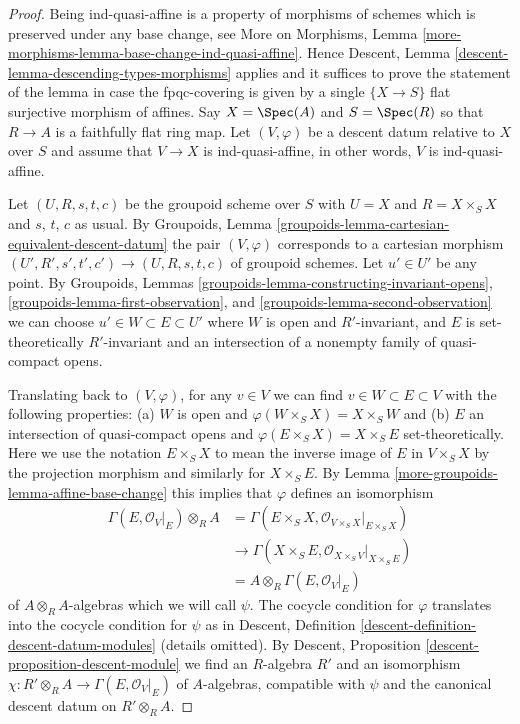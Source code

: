 \begin{proof}
Being ind-quasi-affine is a property of morphisms of schemes
which is preserved under any base change, see
More on Morphisms, Lemma
\ref{more-morphisms-lemma-base-change-ind-quasi-affine}.
Hence Descent, Lemma \ref{descent-lemma-descending-types-morphisms} applies
and it suffices to prove the statement of the lemma
in case the fpqc-covering is given by a single
$\{X \to S\}$ flat surjective morphism of affines.
Say $X = \Spec(A)$ and $S = \Spec(R)$ so
that $R \to A$ is a faithfully flat ring map.
Let $(V, \varphi)$ be a descent datum relative to $X$ over $S$
and assume that $V \to X$ is ind-quasi-affine, in other words,
$V$ is ind-quasi-affine.

\medskip\noindent
Let $(U, R, s, t, c)$ be the groupoid scheme over $S$ with
$U = X$ and $R = X \times_S X$ and $s$, $t$, $c$ as usual.
By Groupoids, Lemma \ref{groupoids-lemma-cartesian-equivalent-descent-datum}
the pair $(V, \varphi)$ corresponds to a cartesian morphism
$(U', R', s', t', c') \to (U, R, s, t, c)$ of groupoid schemes.
Let $u' \in U'$ be any point. By
Groupoids, Lemmas \ref{groupoids-lemma-constructing-invariant-opens},
\ref{groupoids-lemma-first-observation}, and
\ref{groupoids-lemma-second-observation}
we can choose $u' \in W \subset E \subset U'$
where $W$ is open and $R'$-invariant, and
$E$ is set-theoretically $R'$-invariant and
an intersection of a nonempty family of quasi-compact opens.

\medskip\noindent
Translating back to $(V, \varphi)$, for any $v \in V$ we can find
$v \in W \subset E \subset V$ with the following properties:
(a) $W$ is open and $\varphi(W \times_S X) = X \times_S W$ and
(b) $E$ an intersection of quasi-compact opens and
$\varphi(E \times_S X) = X \times_S E$ set-theoretically.
Here we use the notation $E \times_S X$ to mean the
inverse image of $E$ in $V \times_S X$ by the projection morphism and
similarly for $X \times_S E$. By Lemma \ref{more-groupoids-lemma-affine-base-change}
this implies that $\varphi$ defines an isomorphism
\begin{align*}
\Gamma(E, \mathcal{O}_V|_E) \otimes_R A
& =
\Gamma(E \times_S X, \mathcal{O}_{V \times_S X}|_{E \times_S X}) \\
& \to
\Gamma(X \times_S E, \mathcal{O}_{X \times_S V}|_{X \times_S E}) \\
& =
A \otimes_R \Gamma(E, \mathcal{O}_V|_E)
\end{align*}
of $A \otimes_R A$-algebras which we will call $\psi$.
The cocycle condition for $\varphi$
translates into the cocycle condition for $\psi$ as in
Descent, Definition \ref{descent-definition-descent-datum-modules}
(details omitted). By Descent, Proposition
\ref{descent-proposition-descent-module}
we find an $R$-algebra $R'$ and an isomorphism
$\chi : R' \otimes_R A \to \Gamma(E, \mathcal{O}_V|_E)$
of $A$-algebras, compatible with $\psi$ and the
canonical descent datum on $R' \otimes_R A$.


\end{proof}
